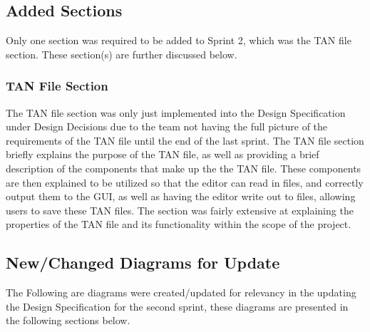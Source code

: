 \documentclass[12pt]{article}
\begin{document}
\begin{appendices}
    
    \subsection{Added Sections}
      Only one section was required to be added to Sprint 2, which was the TAN file section. These section(s) are further discussed below.
    
      \subsubsection{TAN File Section}
        The TAN file section was only just implemented into the Design Specification under Design Decisions due to the team not having the full picture of the requirements of the TAN file until the end of the last sprint. The TAN file section briefly explains the purpose of the TAN file, as well as providing a brief description of the components that make up the the TAN file. These components are then explained to be utilized so that the editor can read in files, and correctly output them to the GUI, as well as having the editor write out to files, allowing users to save these TAN files. The section was fairly extensive at explaining the properties of the TAN file and its functionality within the scope of the project.
    

    
    \subsection{New/Changed Diagrams for Update}
      The Following are diagrams were created/updated for relevancy in the updating the Design Specification for the second sprint, these diagrams are presented in the following sections below.
    

\end{appendices}
\end{document}
